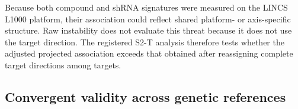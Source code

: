 \documentclass[11pt]{article}
\begin{document}
Because both compound and shRNA signatures were measured on the LINCS L1000
platform, their association could reflect shared platform- or axis-specific
structure. Raw instability does not evaluate this threat because it does not use
the target direction. The registered S2-T analysis therefore tests whether the
adjusted projected association exceeds that obtained after reassigning complete
target directions among targets.

%

\subsection{Convergent validity across genetic references}
\label{sec:references}
\end{document}
